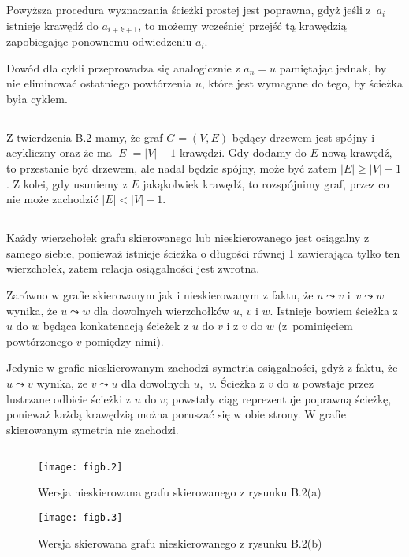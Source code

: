 Powyższa procedura wyznaczania ścieżki prostej jest poprawna, gdyż jeśli z~$a_i$ istnieje krawędź do $a_{i+k+1}$, to możemy wcześniej przejść tą krawędzią zapobiegając ponownemu odwiedzeniu $a_i$.

Dowód dla cykli przeprowadza się analogicznie z $a_n=u$ pamiętając jednak, by nie eliminować ostatniego powtórzenia $u$, które jest wymagane do tego, by ścieżka była cyklem.

\subsection{} %
Z twierdzenia B.2 mamy, że graf $G=(V,E)$ będący drzewem jest spójny i acykliczny oraz że ma $|E|=|V|-1$ krawędzi. Gdy dodamy do $E$ nową krawędź, to przestanie być drzewem, ale nadal będzie spójny, może być zatem $|E|\ge|V|-1$. Z kolei, gdy usuniemy z $E$ jakąkolwiek krawędź, to rozspójnimy graf, przez co nie może zachodzić $|E|<|V|-1$.

\subsection{} %
Każdy wierzchołek grafu skierowanego lub nieskierowanego jest osiągalny z samego siebie, ponieważ istnieje ścieżka o długości równej 1 zawierająca tylko ten wierzchołek, zatem relacja osiągalności jest zwrotna.

Zarówno w grafie skierowanym jak i nieskierowanym z faktu, że $u\leadsto v$ i~$v\leadsto w$ wynika, że $u\leadsto w$ dla dowolnych wierzchołków $u$, $v$ i $w$. Istnieje bowiem ścieżka z $u$ do $w$ będąca konkatenacją ścieżek z $u$ do $v$ i z $v$ do $w$ (z~pominięciem powtórzonego $v$ pomiędzy nimi).

Jedynie w grafie nieskierowanym zachodzi symetria osiągalności, gdyż z faktu, że $u\leadsto v$ wynika, że $v\leadsto u$ dla dowolnych $u$,~$v$. Ścieżka z $v$ do $u$ powstaje przez lustrzane odbicie ścieżki z $u$ do $v$; powstały ciąg reprezentuje poprawną ścieżkę, ponieważ każdą krawędzią można poruszać się w obie strony. W grafie skierowanym symetria nie zachodzi.

\subsection{} %
\begin{figure}[h]
	\begin{center}
		\texttt{[image: figb.2]}
	\end{center}
	\caption{Wersja nieskierowana grafu skierowanego z rysunku B.2(a)}
\end{figure}
\begin{figure}[h]
	\begin{center}
		\texttt{[image: figb.3]}
	\end{center}
	\caption{Wersja skierowana grafu nieskierowanego z rysunku B.2(b)}
\end{figure}

